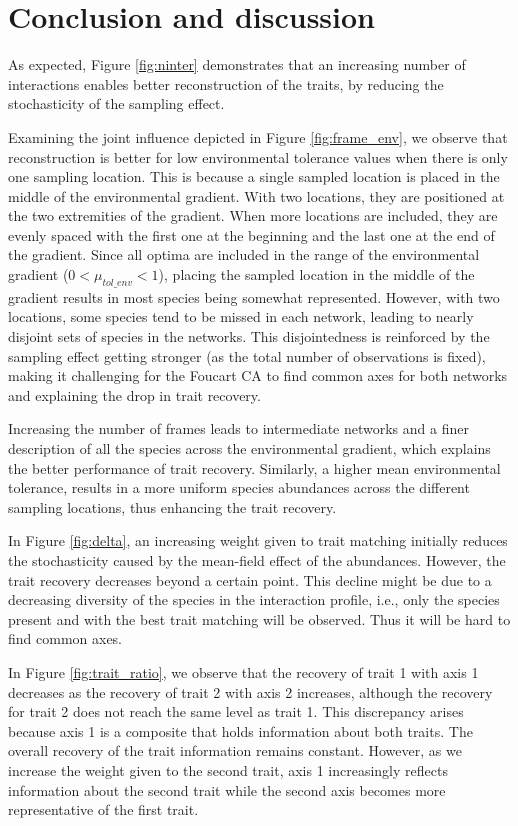 \section{Conclusion and discussion}

As expected, Figure \ref{fig:ninter} demonstrates that an increasing number of interactions enables better reconstruction of the traits, by reducing the stochasticity of the sampling effect.


Examining the joint influence depicted in Figure \ref{fig:frame_env}, we observe that reconstruction is better for low environmental tolerance values when there is only one sampling location. This is because a single sampled location is placed in the middle of the environmental gradient. With two locations, they are positioned at the two extremities of the gradient. When more locations are included, they are evenly spaced with the first one at the beginning and the last one at the end of the gradient. 
Since all optima are included in the range of the environmental gradient ($0 < \mu_{tol\_env} < 1$), placing the sampled location in the middle of the gradient results in most species being somewhat represented. However, with two locations, some species tend to be missed in each network, leading to nearly disjoint sets of species in the networks. This disjointedness is reinforced by the sampling effect getting stronger (as the total number of observations is fixed), making it challenging for the Foucart CA to find common axes for both networks and explaining the drop in trait recovery.

Increasing the number of frames leads to intermediate networks and a finer description of all the species across the environmental gradient, which explains the better performance of trait recovery. Similarly, a higher mean environmental tolerance, results in a more uniform species abundances across the different sampling locations, thus enhancing the trait recovery.


In Figure \ref{fig:delta}, an increasing weight given to trait matching initially reduces the stochasticity caused by the mean-field effect of the abundances. However, the trait recovery decreases beyond a certain point. This decline might be due to a decreasing diversity of the species in the interaction profile, i.e., only the species present and with the best trait matching will be observed. Thus it will be hard to find common axes.


In Figure \ref{fig:trait_ratio}, we observe that the recovery of trait 1 with axis 1 decreases as the recovery of trait 2 with axis 2 increases, although the recovery for trait 2 does not reach the same level as trait 1. This discrepancy arises because axis 1 is a composite that holds information about both traits. The overall recovery of the trait information remains constant. However, as we increase the weight given to the second trait, axis 1 increasingly reflects information about the second trait while the second axis becomes more representative of the first trait.



